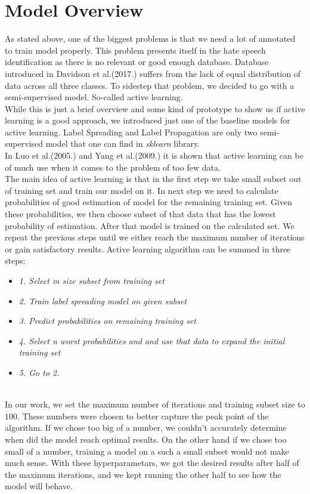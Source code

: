 \documentclass[10pt, a4paper]{article}
\begin{document}
\section{Model Overview}
As stated above, one of the biggest problems is that we need a lot of annotated to train model properly. This problem presents itself in the hate speech identification as there is no relevant or good enough database. Database introduced in Davidson et al.(2017.) suffers from the lack of equal distribution of data across all three classes. To sidestep that problem, we decided to go with a semi-supervised model. So-called active learning.
\\While this is just a brief overview and some kind of prototype to show us if active learning is a good approach, we introduced just one of the baseline models for active learning. Label Spreading and Label Propagation are only two semi-supervised model that one can find in \textit{sklearn} library.
\\In Luo et al.(2005.) and Yang et al.(2009.) it is shown that active learning can be of much use when it comes to the problem of too few data.
\\The main idea of active learning is that in the first step we take small subset out of training set and train our model on it. In next step we need to calculate probabilities of good estimation of model for the remaining training set. Given these probabilities, we then choose subset of that data that has the lowest probability of estimation. After that model is trained on the calculated set. We repeat the previous steps until we either reach the maximum number of iterations or gain satisfactory results.
Active learning algorithm can be summed in three steps:
\begin{itemize}
	\item \textit{1. Select m size subset from training set}
	\item \textit{2. Train label spreading model on given subset}
	\item \textit{3. Predict probabilities on remaining training set}
	\item \textit{4. Select n worst probabilities and and use that data to expand the initial training set}
	\item \textit{5. Go to 2.}
\end{itemize}
\\In our work, we set the maximum number of iterations and training subset size to $100$. These numbers were chosen to better capture the peak point of the algorithm. If we chose too big of a number, we couldn't accurately determine when did the model reach optimal results. On the other hand if we chose too small of a number, training a model on a such a small subset would not make much sense. With these hyperparametars, we got the desired results after half of the maximum iterations, and we kept running the other half to see how the model will behave.
\end{document}

